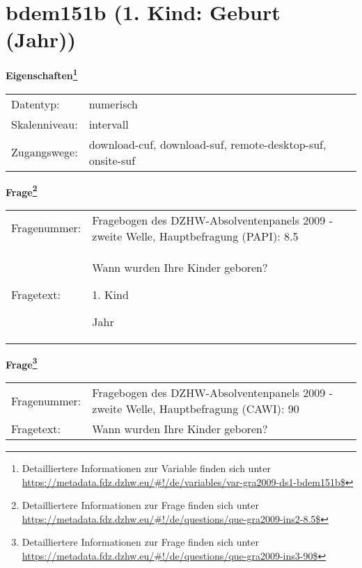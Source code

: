 
    \setcounter{footnote}{0}

    \vspace*{-1.8cm}
	\section{bdem151b (1. Kind: Geburt (Jahr))}
	\label{section:bdem151b}



    \vspace*{0.5cm}
    \noindent\textbf{Eigenschaften\footnote{Detailliertere Informationen zur Variable finden sich unter
		\url{https://metadata.fdz.dzhw.eu/\#!/de/variables/var-gra2009-ds1-bdem151b$}}}\\
	\begin{tabularx}{\hsize}{@{}lX}
	Datentyp: & numerisch \\
	Skalenniveau: & intervall \\
	Zugangswege: &
	  download-cuf, 
	  download-suf, 
	  remote-desktop-suf, 
	  onsite-suf
 \\
    \end{tabularx}



				\vspace*{0.5cm}
                \noindent\textbf{Frage\footnote{Detailliertere Informationen zur Frage finden sich unter
		              \url{https://metadata.fdz.dzhw.eu/\#!/de/questions/que-gra2009-ins2-8.5$}}}\\
				\begin{tabularx}{\hsize}{@{}lX}
					Fragenummer: &
					  Fragebogen des DZHW-Absolventenpanels 2009 - zweite Welle, Hauptbefragung (PAPI):
					  8.5
 \\
					Fragetext: & Wann wurden Ihre Kinder geboren?\par  1. Kind\par  Jahr \\
				\end{tabularx}
				\vspace*{0.5cm}
                \noindent\textbf{Frage\footnote{Detailliertere Informationen zur Frage finden sich unter
		              \url{https://metadata.fdz.dzhw.eu/\#!/de/questions/que-gra2009-ins3-90$}}}\\
				\begin{tabularx}{\hsize}{@{}lX}
					Fragenummer: &
					  Fragebogen des DZHW-Absolventenpanels 2009 - zweite Welle, Hauptbefragung (CAWI):
					  90
 \\
					Fragetext: & Wann wurden Ihre Kinder geboren? \\
				\end{tabularx}





